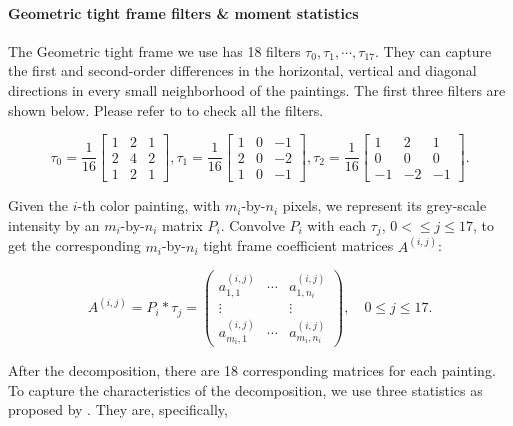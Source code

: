 \documentclass{article}
\begin{document}
\paragraph{Geometric tight frame filters \& moment statistics}

The Geometric tight frame we use has 18 filters $\tau_0,\tau_1,\cdots,\tau_{17}$. They can capture the first and second-order differences in the horizontal, vertical and diagonal directions in every small neighborhood of the paintings. The first three filters are shown below. Please refer to \citet{liu2016geometric} to check all the filters.

\begin{equation}
\tau_0 = \frac{1}{16}
\begin{bmatrix}
1 & 2 & 1 \\
2 & 4 & 2 \\
1 & 2 & 1
\end{bmatrix},
\tau_1 = \frac{1}{16}
\begin{bmatrix}
1 & 0 & -1 \\
2 & 0 & -2 \\
1 & 0 & -1
\end{bmatrix},
\tau_2 = \frac{1}{16}
\begin{bmatrix}
1 & 2 & 1 \\
0 & 0 & 0 \\
-1 & -2 & -1
\end{bmatrix}.
\end{equation}

Given the $i$-th color painting, with $m_i$-by-$n_i$ pixels, we represent its grey-scale intensity by an $m_i$-by-$n_i$ matrix $P_i$. 
Convolve $P_i$ with each $\tau_j$, $0<\leq j \leq 17$, to get the corresponding $m_i$-by-$n_i$ tight frame coefficient matrices $A^{(i,j)}$:

\begin{equation}
A^{(i,j)} = P_i*\tau_j = 
\begin{pmatrix}
a_{1,1}^{(i,j)} & \cdots & a_{1,n_i}^{(i,j)}\\
\vdots & & \vdots\\
a_{m_i,1}^{(i,j)} & \cdots & a_{m_i,n_i}^{(i,j)}
\end{pmatrix},
\quad 0\leq j \leq 17.
\end{equation}


After the decomposition, there are 18 corresponding matrices for each painting. 
To capture the characteristics of the decomposition, we use three statistics as proposed by \citet{liu2016geometric}. They are, specifically,
\end{document}
